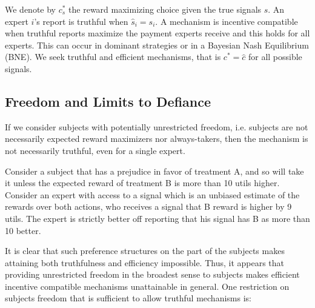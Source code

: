 We denote by $c^{*}_s$ the reward maximizing choice given the true signals $s$.
An expert $i$'s report is truthful when $\hat{s}_i=s_i$. A mechanism is incentive compatible when truthful reports maximize the payment experts receive and this holds for all experts. This can occur in dominant strategies or in a Bayesian Nash Equilibrium (BNE).  We seek truthful and efficient mechanisms, that is $c^{*} = \hat{c}$ for all possible signals.






\subsection{Freedom and Limits to Defiance}

If we consider subjects with potentially unrestricted freedom, i.e. subjects are not necessarily expected reward maximizers nor always-takers, then the mechanism is not necessarily truthful, even for a single expert. 

\begin{eg}
	Consider a subject that has a prejudice in favor of treatment A, and so will take it unless the expected reward of treatment B is more than 10 utils higher. Consider an expert with access to a signal which is an unbiased estimate of the rewards over both actions, who receives a signal that B reward is higher by 9 utils. The expert is strictly better off reporting that his signal has B as more than 10 better.
\end{eg}



It is clear that such preference structures on the part of the subjects makes attaining both truthfulness and efficiency impossible. 
Thus, it appears that providing unrestricted freedom in the broadest sense to subjects makes efficient incentive compatible mechanisms unattainable in general.
One restriction on subjects freedom that is sufficient to allow truthful mechanisms is: 

